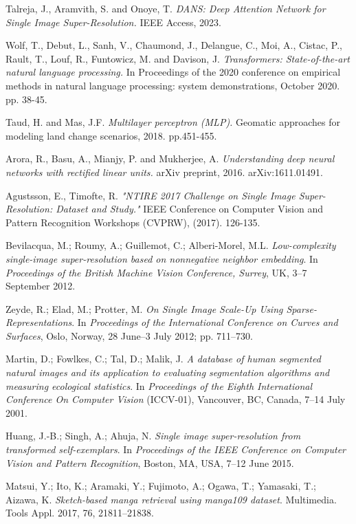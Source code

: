 \documentclass[journal]{IEEEtran}
\begin{document}
\begin{thebibliography}{00}
 Talreja, J., Aramvith, S. and Onoye, T. \textit{DANS: Deep Attention Network for Single Image Super-Resolution.} IEEE Access, 2023.

 Wolf, T., Debut, L., Sanh, V., Chaumond, J., Delangue, C., Moi, A., Cistac, P., Rault, T., Louf, R., Funtowicz, M. and Davison, J. \textit{Transformers: State-of-the-art natural language processing.} In Proceedings of the 2020 conference on empirical methods in natural language processing: system demonstrations, October 2020. pp. 38-45.

 Taud, H. and Mas, J.F. \textit{Multilayer perceptron (MLP).} Geomatic approaches for modeling land change scenarios, 2018.  pp.451-455.

 Arora, R., Basu, A., Mianjy, P. and Mukherjee, A. \textit{Understanding deep neural networks with rectified linear units.} arXiv preprint, 2016. arXiv:1611.01491.

 Agustsson, E.,  Timofte, R. \textit{"NTIRE 2017 Challenge on Single Image Super-Resolution: Dataset and Study."} IEEE Conference on Computer Vision and Pattern Recognition Workshops (CVPRW), (2017). 126-135.

 Bevilacqua, M.; Roumy, A.; Guillemot, C.; Alberi-Morel, M.L. \textit{Low-complexity single-image super-resolution based on nonnegative neighbor embedding}. In \textit{Proceedings of the British Machine Vision Conference, Surrey}, UK, 3–7 September 2012.

 Zeyde, R.; Elad, M.; Protter, M. \textit{On Single Image Scale-Up Using Sparse-Representations}. In \textit{Proceedings of the International Conference on Curves and Surfaces}, Oslo, Norway, 28 June–3 July 2012; pp. 711–730.

 Martin, D.; Fowlkes, C.; Tal, D.; Malik, J. \textit{A database of human segmented natural images and its application to evaluating segmentation algorithms and measuring ecological statistics}. In \textit{Proceedings of the Eighth International Conference On Computer Vision} (ICCV-01), Vancouver, BC, Canada, 7–14 July 2001.

 Huang, J.-B.; Singh, A.; Ahuja, N. \textit{Single image super-resolution from transformed self-exemplars}. In \textit{Proceedings of the IEEE Conference on Computer Vision and Pattern Recognition}, Boston, MA, USA, 7–12 June 2015.

 Matsui, Y.; Ito, K.; Aramaki, Y.; Fujimoto, A.; Ogawa, T.; Yamasaki, T.; Aizawa, K. \textit{Sketch-based manga retrieval using manga109 dataset}. Multimedia. Tools Appl. 2017, 76, 21811–21838.


\end{thebibliography}
\end{document}
